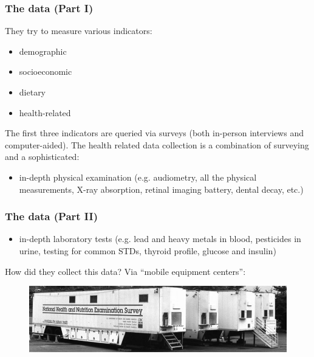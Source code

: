 \documentclass[presentation]{beamer}
\begin{document}
\begin{frame}
	\frametitle{The data (Part I)}

They try to measure various indicators:

\begin{itemize}
\item demographic
\item socioeconomic
\item dietary
\item health-related
\end{itemize}

\pause

The first three indicators are queried via surveys (both in-person interviews and computer-aided). \pause The health related data collection is a combination of surveying and a sophisticated: \pause

\begin{itemize}
\item in-depth physical examination \pause
(e.g. audiometry, \pause all the physical measurements, \pause X-ray absorption, \pause retinal imaging battery, \pause dental decay, etc.)
\end{itemize}

\end{frame}

\begin{frame}
	\frametitle{The data (Part II)}

\begin{itemize}
\item in-depth laboratory tests \pause
(e.g. lead and heavy metals in blood, \pause pesticides in urine, \pause testing for common STDs, \pause thyroid profile, \pause  glucose and insulin) \pause
\end{itemize}

How did they collect this data? \pause Via ``mobile equipment centers'':

\begin{figure}[htp]
\centering
\includegraphics[width=4.5in]{mec.jpg}
\end{figure}
\FloatBarrier

\end{frame}
\end{document}
